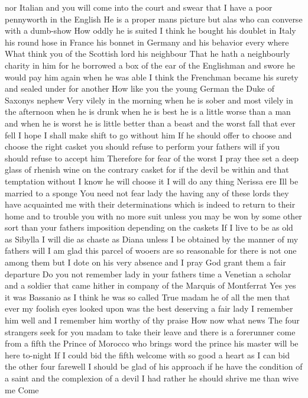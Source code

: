 nor Italian and you will come into the court and
swear that I have a poor pennyworth in the English
He is a proper mans picture but alas who can
converse with a dumb-show How oddly he is suited
I think he bought his doublet in Italy his round
hose in France his bonnet in Germany and his
behavior every where
What think you of the Scottish lord his neighbour
That he hath a neighbourly charity in him for he
borrowed a box of the ear of the Englishman and
swore he would pay him again when he was able I
think the Frenchman became his surety and sealed
under for another
How like you the young German the Duke of Saxonys nephew
Very vilely in the morning when he is sober and
most vilely in the afternoon when he is drunk when
he is best he is a little worse than a man and
when he is worst he is little better than a beast
and the worst fall that ever fell I hope I shall
make shift to go without him
If he should offer to choose and choose the right
casket you should refuse to perform your fathers
will if you should refuse to accept him
Therefore for fear of the worst I pray thee set a
deep glass of rhenish wine on the contrary casket
for if the devil be within and that temptation
without I know he will choose it I will do any
thing Nerissa ere Ill be married to a sponge
You need not fear lady the having any of these
lords they have acquainted me with their
determinations which is indeed to return to their
home and to trouble you with no more suit unless
you may be won by some other sort than your fathers
imposition depending on the caskets
If I live to be as old as Sibylla I will die as
chaste as Diana unless I be obtained by the manner
of my fathers will I am glad this parcel of wooers
are so reasonable for there is not one among them
but I dote on his very absence and I pray God grant
them a fair departure
Do you not remember lady in your fathers time a
Venetian a scholar and a soldier that came hither
in company of the Marquis of Montferrat
Yes yes it was Bassanio as I think he was so called
True madam he of all the men that ever my foolish
eyes looked upon was the best deserving a fair lady
I remember him well and I remember him worthy of
thy praise
How now what news
The four strangers seek for you madam to take
their leave and there is a forerunner come from a
fifth the Prince of Morocco who brings word the
prince his master will be here to-night
If I could bid the fifth welcome with so good a
heart as I can bid the other four farewell I should
be glad of his approach if he have the condition
of a saint and the complexion of a devil I had
rather he should shrive me than wive me Come
